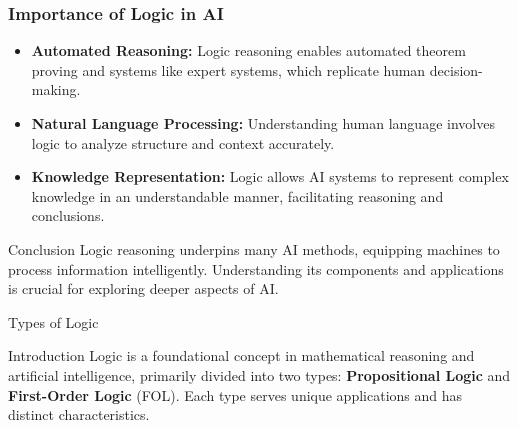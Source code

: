 \documentclass[aspectratio=169]{beamer}
\begin{document}
\begin{frame}[fragile]
    \frametitle{Importance of Logic in AI}
    \begin{itemize}
        \item \textbf{Automated Reasoning:} 
        Logic reasoning enables automated theorem proving and systems like expert systems, which replicate human decision-making.
        \item \textbf{Natural Language Processing:} 
        Understanding human language involves logic to analyze structure and context accurately.
        \item \textbf{Knowledge Representation:} 
        Logic allows AI systems to represent complex knowledge in an understandable manner, facilitating reasoning and conclusions.
    \end{itemize}
    
    \begin{block}{Conclusion}
        Logic reasoning underpins many AI methods, equipping machines to process information intelligently. Understanding its components and applications is crucial for exploring deeper aspects of AI.
    \end{block}
\end{frame}

\begin{frame}[fragile]{Types of Logic}
\begin{block}{Introduction}
Logic is a foundational concept in mathematical reasoning and artificial intelligence, primarily divided into two types: 
\textbf{Propositional Logic} and \textbf{First-Order Logic} (FOL). Each type serves unique applications and has distinct characteristics.
\end{block}
\end{frame}
\end{document}

